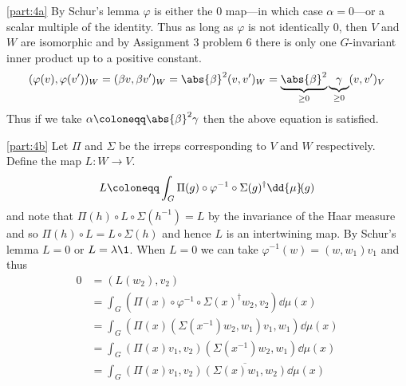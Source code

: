 \documentclass[
	pages,
	boxes,
	color=WildStrawberry
]{homework}
\begin{document}
\begin{solution}
	\ref{part:4a}
	By Schur's lemma $\varphi$ is either the 0 map---in which case $\alpha = 0$---or a scalar multiple of the identity. Thus as long as $\varphi$ is not identically 0, then $V$ and $W$ are isomorphic and by Assignment 3 problem 6 there is only one $G$-invariant inner product up to a positive constant.
	\begin{equation*}
		(\varphi(v), \varphi(v'))_W = (\beta v, \beta v')_W = \abs{\beta}^2(v, v')_W = \underbrace{\abs{\beta}^2}_{\geq 0}\underbrace{\gamma}_{\geq 0}(v, v')_V
	\end{equation*}
	Thus if we take $\alpha \defeq \abs{\beta}^2\gamma$ then the above equation is satisfied.

	\ref{part:4b}
	Let $\Pi$ and $\Sigma$ be the irreps corresponding to $V$ and $W$ respectively. Define the map $L: W \to V$.
	\begin{equation*}
		L\defeq \int_G \Pi(g)\circ \varphi^{-1} \circ \Sigma(g)^\dagger \dd{\mu}\!(g)
	\end{equation*}
	and note that $\Pi(h) \circ L \circ \Sigma(h^{-1}) = L$ by the invariance of the Haar measure and so $\Pi(h) \circ L = L \circ \Sigma(h)$ and hence $L$ is an intertwining map. By Schur's lemma $L = 0$ or $L = \lambda\1$. When $L = 0$ we can take $\varphi^{-1}(w) = (w, w_1)v_1$ and thus
	\begin{align*}
		0 & = (L(w_2), v_2)                                                                   \\
		  & = \int_G(\Pi(x)\circ \varphi^{-1} \circ \Sigma(x)^\dagger w_2, v_2) \dd{\mu}\!(x) \\
		  & = \int_G(\Pi(x)(\Sigma(x^{-1})w_2, w_1)v_1, w_1)\dd{\mu}\!(x)                     \\
		  & = \int_G(\Pi(x) v_1, v_2)(\Sigma(x^{-1})w_2, w_1)\dd{\mu}\!(x)                    \\
		  & = \int_G(\Pi(x) v_1, v_2)\overline{(\Sigma(x)w_1, w_2)}\dd{\mu}\!(x)
	\end{align*}


\end{solution}
\end{document}
